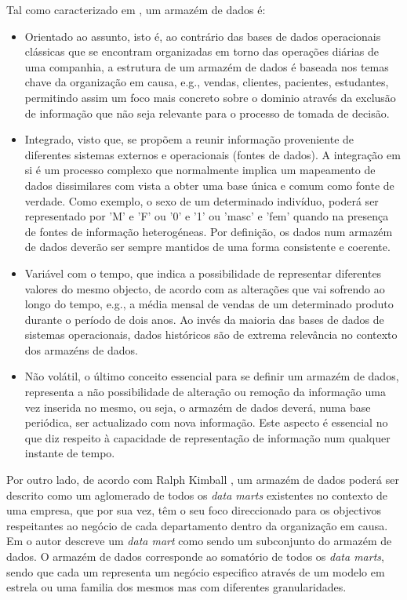 Tal como caracterizado em \citet{Inmon92}, um armazém de dados é:
\begin{itemize}
    \item Orientado ao assunto, isto é, ao contrário das bases de dados
    operacionais clássicas que se encontram organizadas em torno das operações
    diárias de uma companhia, a estrutura de um armazém de dados é baseada nos
    temas chave da organização em causa, e.g., vendas, clientes, pacientes,
    estudantes, permitindo assim um foco mais concreto sobre o dominio através
    da exclusão de informação que não seja relevante para o processo de tomada
    de decisão.

    \item Integrado, visto que, se propõem a reunir informação proveniente de
    diferentes sistemas externos e operacionais (fontes de dados). A integração
    em si é um processo complexo que normalmente implica um mapeamento de dados
    dissimilares com vista a obter uma base única e comum como fonte de verdade.
    Como exemplo, o sexo de um determinado indivíduo, poderá ser representado por
    'M' e 'F' ou '0' e '1' ou 'masc' e 'fem' quando na presença de fontes de
    informação heterogéneas. Por definição, os dados num armazém de dados
    deverão ser sempre mantidos de uma forma consistente e coerente.

    \item Variável com o tempo, que indica a possibilidade de representar
    diferentes valores do mesmo objecto, de acordo com as alterações que vai
    sofrendo ao longo do tempo, e.g., a média mensal de vendas de um determinado
    produto durante o período de dois anos. Ao invés da maioria das bases de dados
    de sistemas operacionais, dados históricos são de extrema relevância no
    contexto dos armazéns de dados.

    \item Não volátil, o último conceito essencial para se definir um armazém
    de dados, representa a não possibilidade de alteração ou remoção da
    informação uma vez inserida no mesmo, ou seja, o armazém de dados deverá,
    numa base periódica, ser actualizado com nova informação. Este aspecto é
    essencial no que diz respeito à capacidade de representação de informação
    num qualquer instante de tempo.
\end{itemize}

Por outro lado, de acordo com Ralph Kimball \citet{Kimball02}, um armazém de dados
poderá ser descrito como um aglomerado de todos os \textit{data marts} existentes
no contexto de uma empresa, que por sua vez, têm o seu foco direccionado para
os objectivos respeitantes ao negócio de cada departamento dentro da organização
em causa. Em \citet{Kimball96} o autor descreve um \textit{data mart} como sendo
um subconjunto do armazém de dados. O armazém de dados corresponde ao somatório
de todos os \textit{data marts}, sendo que cada um representa um negócio especifico
através de um modelo em estrela ou uma familia dos mesmos mas com diferentes
granularidades.
